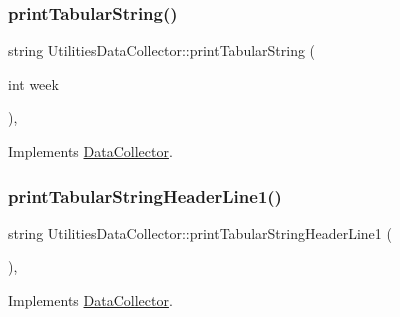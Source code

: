 \mbox{\label{classUtilitiesDataCollector_a39e7d28a70a0f71b3f1cc28b19c7e2d9_a39e7d28a70a0f71b3f1cc28b19c7e2d9}} 
\subsubsection{\texorpdfstring{print\+Tabular\+String()}{printTabularString()}}
{\footnotesize\ttfamily string Utilities\+Data\+Collector\+::print\+Tabular\+String (\begin{DoxyParamCaption}\item[{int}]{week }\end{DoxyParamCaption})\hspace{0.3cm}{\ttfamily [override]}, {\ttfamily [virtual]}}



Implements \mbox{\hyperlink{classDataCollector_a397fccabe0223267eea8fc7cac0e59da_a397fccabe0223267eea8fc7cac0e59da}{Data\+Collector}}.

\mbox{\label{classUtilitiesDataCollector_a796aa9d7637d8ed04dbd949ca2a34088_a796aa9d7637d8ed04dbd949ca2a34088}} 
\subsubsection{\texorpdfstring{print\+Tabular\+String\+Header\+Line1()}{printTabularStringHeaderLine1()}}
{\footnotesize\ttfamily string Utilities\+Data\+Collector\+::print\+Tabular\+String\+Header\+Line1 (\begin{DoxyParamCaption}{ }\end{DoxyParamCaption})\hspace{0.3cm}{\ttfamily [override]}, {\ttfamily [virtual]}}



Implements \mbox{\hyperlink{classDataCollector_a91619cfa9e9b8cefd2f7c20d5718b41e_a91619cfa9e9b8cefd2f7c20d5718b41e}{Data\+Collector}}.

